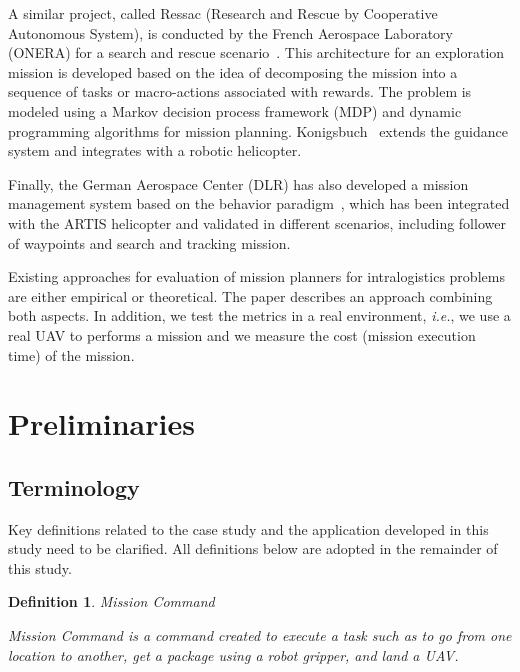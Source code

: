 \documentclass[conference,harvard,brazil,english]{sbatex}
\newtheorem{myDefinition}{Definition}
\begin{document}
A similar project, called Ressac (Research and Rescue by Cooperative Autonomous System), is conducted by the French Aerospace Laboratory (ONERA) for a search and rescue scenario~\cite{fabiani2007autonomous}. This architecture for an exploration mission is developed based on the idea of decomposing the mission into a sequence of tasks or macro-actions associated with rewards. The problem is modeled using a Markov decision process framework (MDP) and dynamic programming algorithms for mission planning. Konigsbuch~\cite{teichteil2007multi} extends the guidance system and integrates with a robotic helicopter.

Finally, the German Aerospace Center (DLR) has also developed a mission management system based on the behavior paradigm~\cite{adolf2010onboard}, which has been integrated with the ARTIS helicopter and validated in different scenarios, including follower of waypoints and search and tracking mission.

Existing approaches for evaluation of mission planners for intralogistics problems are either empirical or theoretical. The paper describes an approach combining both aspects. In addition, we test the metrics in a real environment, \textit{i.e.}, we use a real UAV to performs a mission and we measure the cost (mission execution time) of the mission.

\section{Preliminaries}
\label{sec:background}

\subsection{Terminology}
\label{sec:terms}

Key definitions related to the case study and the application developed in this study need to be clarified. All definitions below are adopted in the remainder of this study.

\begin{myDefinition} {Mission Command} 

Mission Command is a command created to execute a task such as to go from one location to another, get a package using a robot gripper, and land a UAV.
\label{def:missioncommand}
\end{myDefinition}
\end{document}
